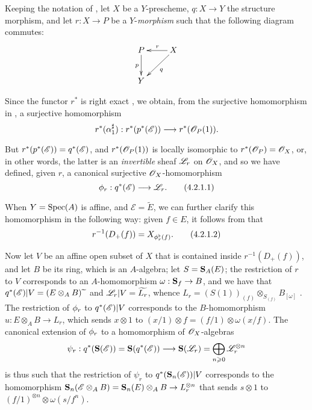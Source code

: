 \begin{env}[4.2.1]
\label{II.4.2.1}
Keeping the notation of , let $X$ be a $Y$-prescheme, $q:X\to Y$ the structure morphism, and let $r:X\to P$ be a $Y$-\emph{morphism} such that the following diagram commutes:
\[
  \xymatrix{
    P \ar[d]_p & X \ar[l]_r \ar[dl]^q
  \\Y
  }
\]

Since the functor $r^*$ is right exact , we obtain, from the surjective homomorphism in , a surjective homomorphism
\[
  r^*(\alpha_1^\sharp): r^*(p^*(\sh{E})) \to r^*(\sh{O}_P(1)).
\]

But $r^*(p^*(\mathscr{E}))=q^*(\mathscr{E})$, and $r^*(\mathscr{O}_P(1))$ is locally isomorphic to $r^*(\mathscr{O}_P)=\mathscr{O}_X$, or, in other words, the latter is an \emph{invertible} sheaf $\mathscr{L}_r$ on $\mathscr{O}_X$, and so we have defined, given $r$, a canonical surjective $\mathscr{O}_X$-homomorphism
\[
\label{II.4.2.1.1}
  \vphi_r:q^*(\sh{E}) \to \sh{L}_r.
  \tag{4.2.1.1}
\]

When $Y=\operatorname{Spec}(A)$ is affine, and $\mathscr{E}=\widetilde{E}$, we can further clarify this homomorphism in the following way:
given $f\in E$, it follows from  that
\[
\label{II.4.2.1.2}
  r^{-1}(D_+(f)) = X_{\phi_r^\flat(f)}.
  \tag{4.2.1.2}
\]

Now let $V$ be an affine open subset of $X$ that is contained inside $r^{-1}(D_+(f))$, and let $B$ be its ring, which is an $A$-algebra;
let $S=\mathbf{S}_A(E)$;
the restriction of $r$ to $V$ corresponds to an $A$-homomorphism $\omega:\bb{S}_f\to B$, and we have that $q^*(\mathscr{E})|V = (E\otimes_A B){\,\widetilde{\,}\,}$ and $\mathscr{L}_r|V = \widetilde{L_r}$, whence $L_r = (S(1))_{(f)}\otimes_{S_{(f)}}B_{[\omega]}$ .
The restriction of $\phi_r$ to $q^*(\mathscr{E})|V$ corresponds to the $B$-homomorphism $u:E\otimes_A B\to L_r$, which sends $x\otimes1$ to $(x/1)\otimes f = (f/1)\otimes\omega(x/f)$.
The canonical extension of $\phi_r$ to a homomorphism of $\mathscr{O}_X$-algebras
\[
  \psi_r: q^*(\bb{S}(\sh{E})) = \bb{S}(q^*(\sh{E})) \to \bb{S}(\sh{L}_r) = \bigoplus_{n\geq0}\sh{L}_r^{\otimes n}
\]
is thus such that the restriction of $\psi_r$ to $q^*(\mathbf{S}_n(\mathscr{E}))|V$ corresponds to the homomorphism $\bb{S}_n(\sh{E}\otimes_A B) = \bb{S}_n(E)\otimes_A B \to L_r^{\otimes n}$ that sends $s\otimes1$ to $(f/1)^{\otimes n}\otimes\omega(s/f^n)$.
\end{env}

